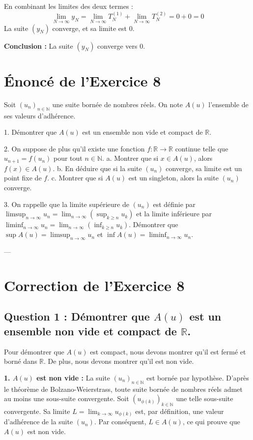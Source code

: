 \documentclass{report}
\begin{document}
En combinant les limites des deux termes :
$$\lim_{N \to \infty} y_N = \lim_{N \to \infty} T_N^{(1)} + \lim_{N \to \infty} T_N^{(2)} = 0 + 0 = 0$$
La suite $(y_N)$ converge, et sa limite est $0$.

\textbf{Conclusion :} La suite $(y_N)$ converge vers $0$.

\newpage


\section*{Énoncé de l'Exercice 8}

Soit $(u_n)_{n \in \mathbb{N}}$ une suite bornée de nombres réels. On note $A(u)$ l'ensemble de ses valeurs d'adhérence.

1.  Démontrer que $A(u)$ est un ensemble non vide et compact de $\mathbb{R}$.

2.  On suppose de plus qu'il existe une fonction $f: \mathbb{R} \to \mathbb{R}$ continue telle que $u_{n+1} = f(u_n)$ pour tout $n \in \mathbb{N}$.
    a.  Montrer que si $x \in A(u)$, alors $f(x) \in A(u)$.
    b.  En déduire que si la suite $(u_n)$ converge, sa limite est un point fixe de $f$.
    c.  Montrer que si $A(u)$ est un singleton, alors la suite $(u_n)$ converge.

3.  On rappelle que la limite supérieure de $(u_n)$ est définie par $\limsup_{n \to \infty} u_n = \lim_{n \to \infty} \left( \sup_{k \ge n} u_k \right)$ et la limite inférieure par $\liminf_{n \to \infty} u_n = \lim_{n \to \infty} \left( \inf_{k \ge n} u_k \right)$.
    Démontrer que $\sup A(u) = \limsup_{n \to \infty} u_n$ et $\inf A(u) = \liminf_{n \to \infty} u_n$.

---

\section*{Correction de l'Exercice 8}

\subsection*{Question 1 : Démontrer que $A(u)$ est un ensemble non vide et compact de $\mathbb{R}$.}

Pour démontrer que $A(u)$ est compact, nous devons montrer qu'il est fermé et borné dans $\mathbb{R}$. De plus, nous devons montrer qu'il est non vide.

\textbf{1. $A(u)$ est non vide :}
La suite $(u_n)_{n \in \mathbb{N}}$ est bornée par hypothèse. D'après le théorème de Bolzano-Weierstrass, toute suite bornée de nombres réels admet au moins une sous-suite convergente. Soit $(u_{\phi(k)})_{k \in \mathbb{N}}$ une telle sous-suite convergente. Sa limite $L = \lim_{k \to \infty} u_{\phi(k)}$ est, par définition, une valeur d'adhérence de la suite $(u_n)$. Par conséquent, $L \in A(u)$, ce qui prouve que $A(u)$ est non vide.
\end{document}

